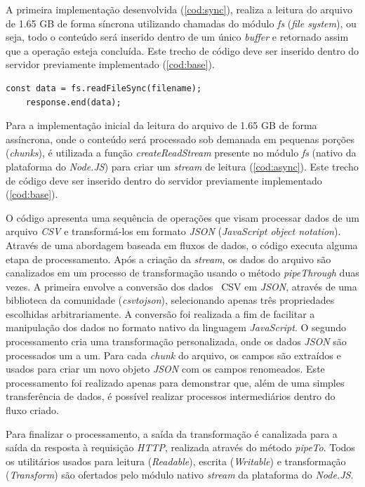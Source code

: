 \documentclass[12pt]{article}
\begin{document}
A primeira implementação desenvolvida (\autoref{cod:sync}), realiza a leitura do arquivo de 1.65 GB
de forma síncrona utilizando chamadas do módulo \textit{fs} (\textit{file system}), ou seja, todo o conteúdo será
inserido dentro de um único \textit{buffer} e retornado assim que a operação esteja concluída. Este trecho de código
deve ser inserido dentro do servidor previamente implementado (\autoref{cod:base}).

\begin{lstlisting}[caption={Implementação da leitura do arquivo de forma síncrona}, label=cod:sync]
	const data = fs.readFileSync(filename);
	response.end(data);
\end{lstlisting}

Para a implementação inicial da leitura do arquivo de 1.65 GB de forma assíncrona,
onde o conteúdo será processado sob demanada em pequenas porções (\textit{chunks}), é utilizada
a função \textit{createReadStream} presente no módulo \textit{fs} (nativo da plataforma do \textit{Node.JS}) para
criar um \textit{stream} de leitura (\autoref{cod:async}). Este trecho de código deve ser inserido dentro do servidor previamente 
implementado (\autoref{cod:base}).

O código apresenta uma sequência de operações que visam processar dados de um arquivo \textit{CSV} e 
transformá-los em formato \textit{JSON} (\textit{JavaScript object notation}). Através de uma abordagem baseada 
em fluxos de dados, o código executa alguma etapa de processamento. Após a criação da \textit{stream}, 
os dados do arquivo são canalizados em um processo de 
transformação usando o método \textit{pipeThrough} duas vezes. A primeira envolve a 
conversão dos dados \
{CSV} em \textit{JSON}, através de uma biblioteca da comunidade (\textit{csvtojson}), 
selecionando apenas três propriedades escolhidas arbitrariamente. A conversão foi realizada a fim de facilitar
a manipulação dos dados no formato nativo da linguagem \textit{JavaScript}. O segundo processamento cria uma 
transformação personalizada, onde os dados \textit{JSON} são processados um a um. 
Para cada \textit{chunk} do arquivo, os campos são extraídos e usados para criar um novo objeto 
\textit{JSON} com os campos renomeados. Este processamento foi realizado apenas para demonstrar que, além de uma simples
transferência de dados, é possível realizar processos intermediários dentro do fluxo criado.

Para finalizar o processamento, a saída da transformação é canalizada para a saída da resposta à requisição
\textit{HTTP}, realizada através do método \textit{pipeTo}. Todos os utilitários
usados para leitura (\textit{Readable}), escrita (\textit{Writable}) e transformação (\textit{Transform}) são ofertados
pelo módulo nativo \textit{stream} da plataforma do \textit{Node.JS}.
\end{document}
